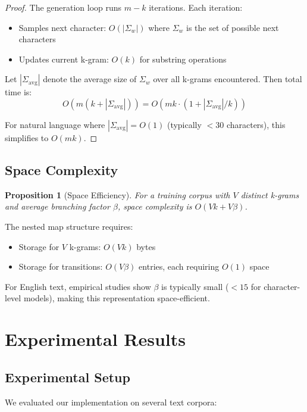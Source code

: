 \documentclass[11pt,letterpaper]{article}
\newtheorem{proposition}[theorem]{Proposition}
\begin{document}
\begin{proof}
The generation loop runs $m - k$ iterations. Each iteration:
\begin{itemize}
    \item Samples next character: $O(|\Sigma_w|)$ where $\Sigma_w$ is the set of possible next characters
    \item Updates current k-gram: $O(k)$ for substring operations
\end{itemize}

Let $|\Sigma_{\text{avg}}|$ denote the average size of $\Sigma_w$ over all k-grams encountered. Then total time is:
\[
O(m(k + |\Sigma_{\text{avg}}|)) = O(mk \cdot (1 + |\Sigma_{\text{avg}}|/k))
\]

For natural language where $|\Sigma_{\text{avg}}| = O(1)$ (typically $< 30$ characters), this simplifies to $O(mk)$.
\end{proof}

\subsection{Space Complexity}

\begin{proposition}[Space Efficiency]
For a training corpus with $V$ distinct k-grams and average branching factor $\beta$, space complexity is $O(Vk + V\beta)$.
\end{proposition}

The nested map structure requires:
\begin{itemize}
    \item Storage for $V$ k-grams: $O(Vk)$ bytes
    \item Storage for transitions: $O(V\beta)$ entries, each requiring $O(1)$ space
\end{itemize}

For English text, empirical studies show $\beta$ is typically small ($< 15$ for character-level models), making this representation space-efficient.

\section{Experimental Results}\label{sec:experiments}

\subsection{Experimental Setup}

We evaluated our implementation on several text corpora:
\end{document}
